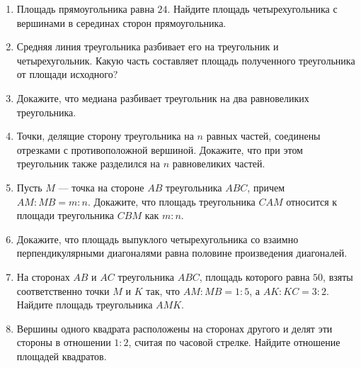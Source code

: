 \documentclass[12pt, a4paper]{article}
\begin{document}
	
	\begin{enumerate}
		\item \textit{} Площадь прямоугольника равна $24$. Найдите площадь четырехугольника с вершинами в серединах сторон прямоугольника.
		\item \textit{} Средняя линия треугольника разбивает его на треугольник и четырехугольник. Какую часть составляет площадь полученного треугольника от площади исходного?
		\item \textit{} Докажите, что медиана разбивает треугольник на два равновеликих треугольника.
		\item \textit{} Точки, делящие сторону треугольника на $n$ равных частей, соединены отрезками с противоположной вершиной. Докажите, что при этом треугольник также разделился на $n$ равновеликих частей.
		\item \textit{} Пусть $M$ — точка на стороне $AB$ треугольника $ABC$, причем $AM : MB = m : n$. Докажите, что площадь треугольника $CAM$ относится к площади треугольника $CBM$ как $m : n$.
		\item \textit{} Докажите, что площадь выпуклого четырехугольника со взаимно перпендикулярными диагоналями равна половине произведения диагоналей.
		\item \textit{} На сторонах $AB$ и $AC$ треугольника $ABC$, площадь которого равна $50$, взяты соответственно точки $M$ и $K$ так, что $AM : MB = 1 : 5$, а $AK : KC = 3 : 2$. Найдите площадь треугольника $AMK$.
		\item \textit{} Вершины одного квадрата расположены на сторонах другого и делят эти стороны в отношении $1 : 2$, считая по часовой стрелке. Найдите отношение площадей квадратов.
	\end{enumerate}
\end{document}
